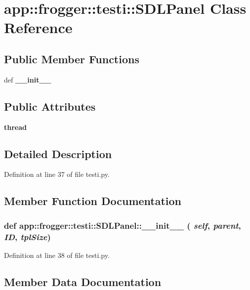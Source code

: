 \section{app::frogger::testi::SDLPanel Class Reference}
\label{classapp_1_1frogger_1_1testi_1_1SDLPanel}
\subsection*{Public Member Functions}
\begin{CompactItemize}
\item 
def {\bf \_\-\_\-init\_\-\_\-}
\end{CompactItemize}
\subsection*{Public Attributes}
\begin{CompactItemize}
\item 
{\bf thread}
\end{CompactItemize}


\subsection{Detailed Description}


Definition at line 37 of file testi.py.

\subsection{Member Function Documentation}
\subsubsection{\setlength{\rightskip}{0pt plus 5cm}def app::frogger::testi::SDLPanel::\_\-\_\-init\_\-\_\- ( {\em self},  {\em parent},  {\em ID},  {\em tplSize})}\label{classapp_1_1frogger_1_1testi_1_1SDLPanel_f544ad320552bd3002581e5fe7146f92}




Definition at line 38 of file testi.py.

\subsection{Member Data Documentation}
